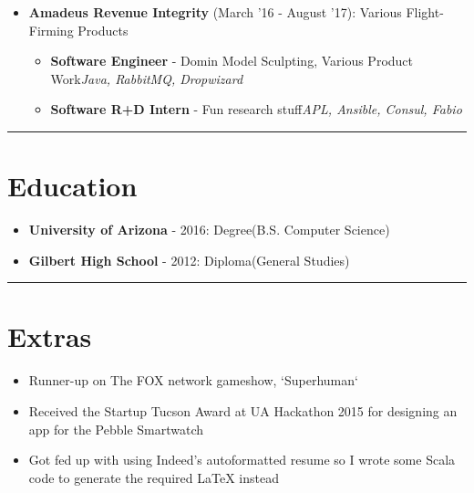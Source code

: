 \documentclass{article}
\begin{document}
\begin{itemize}
\item \textbf{Amadeus Revenue Integrity} {(March '16 - August '17)}: Various Flight-Firming Products \begin{itemize}\item \textbf{Software Engineer} - Domin Model Sculpting, Various Product Work\newline \textit{Java, RabbitMQ, Dropwizard}
\item \textbf{Software R+D Intern} - Fun research stuff\newline \textit{APL, Ansible, Consul, Fabio}\end{itemize}\end{itemize}

\noindent\rule{\linewidth}{1pt}

\section*{Education}

\begin{itemize}\item \textbf{University of Arizona} - 2016: Degree(B.S. Computer Science)
\item \textbf{Gilbert High School} - 2012: Diploma(General Studies)\end{itemize}

\noindent\rule{\linewidth}{1pt}

\section*{Extras}

\begin{itemize}\item Runner-up on The FOX network gameshow, `Superhuman`
\item Received the Startup Tucson Award at UA Hackathon 2015 for designing an app for the Pebble Smartwatch
\item Got fed up with using Indeed's autoformatted resume so I wrote some Scala code to generate the required LaTeX instead\end{itemize}

\vspace*{\fill}

\end{document}
